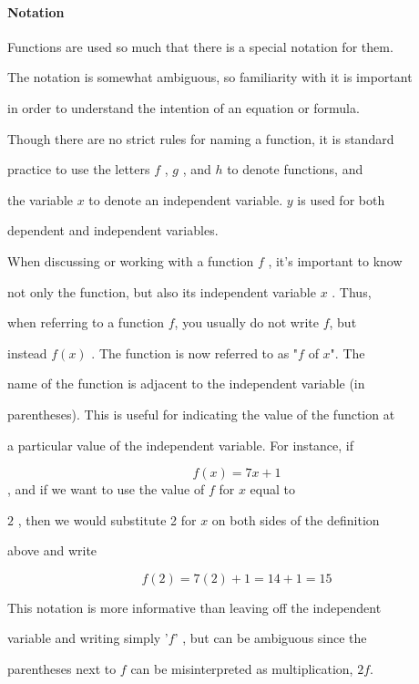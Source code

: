 \paragraph{Notation}



Functions are used so much that there is a special notation for them.

The notation is somewhat ambiguous, so familiarity with it is important

in order to understand the intention of an equation or formula.



Though there are no strict rules for naming a function, it is standard

practice to use the letters $f$ , $g$ , and $h$ to denote functions, and

the variable $x$ to denote an independent variable. $y$ is used for both

dependent and independent variables.



When discussing or working with a function $f$ , it's important to know

not only the function, but also its independent variable $x$ . Thus,

when referring to a function $f$, you usually do not write $f$, but

instead $f(x)$ . The function is now referred to as "$f$ of $x$". The

name of the function is adjacent to the independent variable (in

parentheses). This is useful for indicating the value of the function at

a particular value of the independent variable. For instance, if



$$f(x)=7x+1$$ , and if we want to use the value of $f$ for $x$ equal to

$2$ , then we would substitute 2 for $x$ on both sides of the definition

above and write



$$f(2)=7(2)+1=14+1=15$$



This notation is more informative than leaving off the independent

variable and writing simply '$f$' , but can be ambiguous since the

parentheses next to $f$ can be misinterpreted as multiplication, $2f$.

